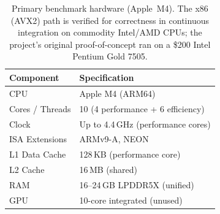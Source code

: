 \documentclass[11pt]{article}
\begin{document}
\begin{table}[h]
\centering
\caption{Primary benchmark hardware (Apple~M4). The x86 (AVX2) path is verified for correctness in continuous integration on commodity Intel/AMD CPUs; the project's original proof-of-concept ran on a \$200 Intel Pentium Gold 7505.}
\begin{tabular}{@{}ll@{}}
\toprule
Component & Specification \\
\midrule
CPU & Apple M4 (ARM64) \\
Cores / Threads & 10 (4 performance + 6 efficiency) \\
Clock & Up to 4.4\,GHz (performance cores) \\
ISA Extensions & ARMv9-A, NEON \\
L1 Data Cache & 128\,KB (performance core) \\
L2 Cache & 16\,MB (shared) \\
RAM & 16--24\,GB LPDDR5X (unified) \\
GPU & 10-core integrated (unused) \\
\bottomrule
\end{tabular}
\end{table}
\end{document}
